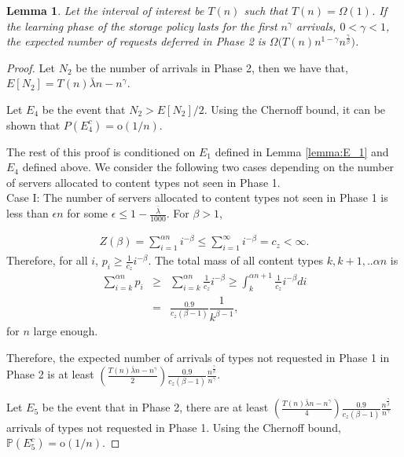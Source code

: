 \documentclass[10pt, conference, letterpaper]{IEEEtran}
\newtheorem{lemma}{Lemma}
\def \oo {\mathrm{o}}
\begin{document}
\begin{lemma}
	\label{lemma:phase2_drops}
	Let the interval of interest be $T(n)$ such that $T(n) = \Omega(1)$. If the learning phase of the storage policy lasts for the first $n^{\gamma}$ arrivals, $0<\gamma < 1$, the expected number of requests deferred in Phase 2 is $\Omega\big(T(n)n^{1-\gamma}n^{\frac{\gamma}{\beta}}\big)$.
\end{lemma}
\begin{proof}
	Let $N_2$ be the number of arrivals in Phase 2, then we have that,
	$E[N_2] = T(n)\bar{\lambda} n - n^{\gamma}$.
	
	Let $E_4$ be the event that $N_2 > E[N_2]/2$. Using the Chernoff bound, it can be shown that $P(E_4^c) = \oo(1/n)$.
	
	The rest of this proof is conditioned on $E_1$ defined in Lemma \ref{lemma:E_1} and $E_4$ defined above. We consider the following two cases depending on the number of servers allocated to content types not seen in Phase 1.\\
	
	\noindent Case I: The number of servers allocated to content types not seen in Phase 1 is less than $\epsilon n$ for some $\epsilon \leq 1-\frac{\bar{\lambda}}{1000}$. For $\beta > 1$,
	
	\begin{eqnarray*}
		Z(\beta) = \sum_{i=1}^{ \alpha n} i^{-\beta} \leq \sum_{i=1}^{\infty} i^{-\beta} = c_z < \infty.
	\end{eqnarray*}
	Therefore, for all $i$, $p_i \geq \frac{1}{c_z} i^{-\beta}.$
	The total mass of all content types $k,k+1, .. \alpha n$ is
	\begin{eqnarray*}
		\sum_{i=k}^{\alpha n} p_i &\geq& \sum_{i=k}^{\alpha n} \frac{1}{c_z} i^{-\beta} \geq \int_{k}^{\alpha n+1} \frac{1}{c_z} i^{-\beta} di\\
		&=& \frac{0.9}{c_z (\beta -1)} \dfrac{1}{k^{\beta-1}},
	\end{eqnarray*}
	for $n$ large enough.
	
	Therefore, the expected number of arrivals of types not requested in Phase 1 in Phase 2 is at least $(\frac{T(n) \bar{\lambda} n- n^{\gamma}}{2})\frac{0.9}{c_z (\beta -1)} \frac{n^{\frac{\gamma}{\beta}}}{n^{\gamma}}$.
	
	Let $E_5$ be the event that in Phase 2, there are at least $(\frac{T(n) \bar{\lambda} n- n^{\gamma}}{4})\frac{0.9}{c_z (\beta -1)} \frac{n^{\frac{\gamma}{\beta}}}{n^{\gamma}}$ arrivals of types not requested in Phase 1. Using the Chernoff bound,
	$
	\mathbb{P}(E_5^c) = \oo(1/n).
	$
	

\end{proof}
\end{document}
